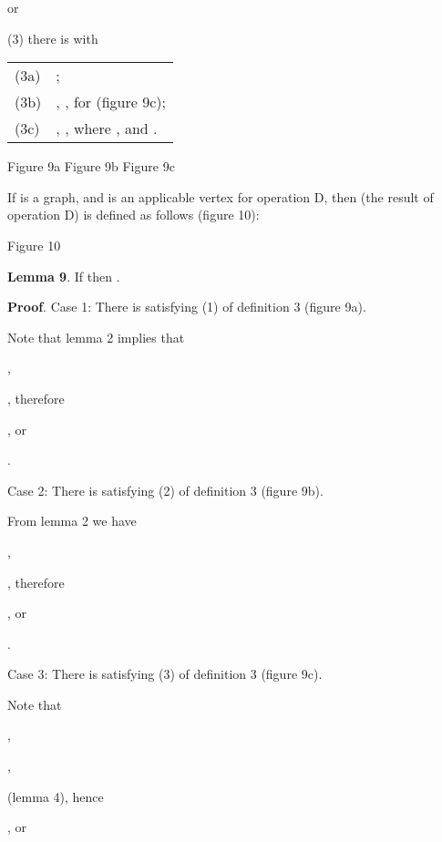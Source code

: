 \documentclass{article}
\begin{document}
or

(3) there is  with

\qquad 
\begin{tabular}{ll}
(3a) & ; \\ 
(3b) & , ,  for  (figure 9c); \\ 
(3c) & , , where , and .\end{tabular}

\begin{center}

Figure 9a \qquad \qquad \qquad Figure 9b \qquad \qquad \qquad Figure
9c\bigskip
\end{center}

If  is a graph, and  is an applicable vertex for operation D, then  (the result of operation D) is defined as follows (figure 10):

\begin{center}

Figure 10\bigskip
\end{center}

\textbf{Lemma 9}. If  then .

\textbf{Proof}. Case 1: There is 
satisfying (1) of definition 3 (figure 9a).

Note that lemma 2 implies that

\begin{center}
,

, therefore

, or

.
\end{center}

Case 2: There is  satisfying (2) of
definition 3 (figure 9b).

From lemma 2 we have

\begin{center}
,

, therefore

, or

.
\end{center}

Case 3: There is  satisfying (3) of
definition 3 (figure 9c).

Note that

\begin{center}
,

,

 (lemma 4), hence

, or 
\end{center}
\end{document}
